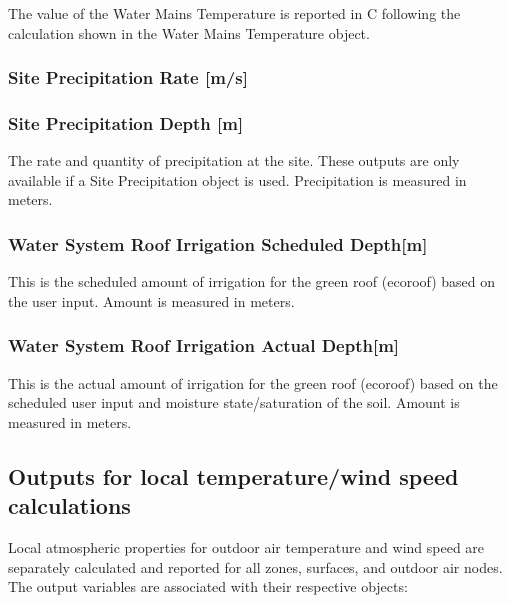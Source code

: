 The value of the Water Mains Temperature is reported in C following the calculation shown in the Water Mains Temperature object.

\subsubsection{Site Precipitation Rate {[}m/s{]}}\label{site-precipitation-rate-ms}

\subsubsection{Site Precipitation Depth {[}m{]}}\label{site-precipitation-depth-m-1}

The rate and quantity of precipitation at the site. These outputs are only available if a Site Precipitation object is used. Precipitation is measured in meters.

\subsubsection{Water System Roof Irrigation Scheduled Depth{[}m{]}}\label{water-system-roof-irrigation-scheduled-depthm}

This is the scheduled amount of irrigation for the green roof (ecoroof) based on the user input. Amount is measured in meters.

\subsubsection{Water System Roof Irrigation Actual Depth{[}m{]}}\label{water-system-roof-irrigation-actual-depthm}

This is the actual amount of irrigation for the green roof (ecoroof) based on the scheduled user input and moisture state/saturation of the soil. Amount is measured in meters.

\subsection{Outputs for local temperature/wind speed calculations}\label{outputs-for-local-temperaturewind-speed-calculations}

Local atmospheric properties for outdoor air temperature and wind speed are separately calculated and reported for all zones, surfaces, and outdoor air nodes. The output variables are associated with their respective objects:

